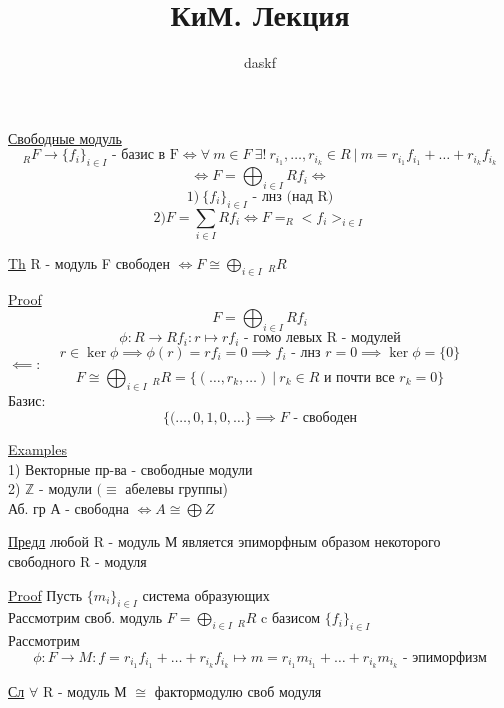 \documentclass[a4paper]{article}
\begin{document}
\title{КиМ. Лекция}
\author{daskf}
\maketitle

\underline{Свободные модуль}
\[
    _RF \rightarrow \{ f_i \}_{i \in I} \text{ - базис в F} \iff 
    \forall \ m \in F \ \exists ! \ r_{i_1}, \dots , r_{i_k} \in R \ | \ 
    m = r_{i_1}f_{i_1}+ \dots + r_{i_k}f_{i_k} 
\]
\[
    \iff F = \bigoplus_{i \in I} Rf_i \iff
\]
\[
    1) \ \{ f_i\}_{i \in I} \text{ - лнз (над R)}
\]
\[
    2) F = \sum_{i \in I}Rf_i \iff F = _R < f_i > _{i \in I}
\]

\begin{tcolorbox}
\underline{Th} R - модуль F свободен $ \iff F \cong \bigoplus_{i \in I}\  _R R $ 

\underline{Proof}
\[
    F = \bigoplus_{i \in I} Rf_i
\]
\[
    \phi: R \to R f_i: r \mapsto r f_i \text{ - гомо левых R - модулей} 
\]
\[
    r \in \ker \phi \implies \phi(r) = rf_i = 0 \implies f_i \text{ - лнз } r = 0
    \implies \ker \phi = \{0\}
\]
$ \impliedby: $ 
\[
    F \cong \bigoplus_{i \in I}\, _RR = \{ (\dots, r_k, \dots )\ | \ r_k \in R
    \text{ и почти все }r_k = 0 \}
\]
Базис:
\[
    \{ (\dots, 0, 1, 0, \dots \} \implies F \text{ - свободен}
\]
\end{tcolorbox}

\begin{tcolorbox}
\underline{Examples}\\
1) Векторные пр-ва - свободные модули\\
2) $ \mathbb{Z} $ - модули $ (\equiv $ абелевы группы)\\
Аб. гр А - свободна $ \iff A \cong \bigoplus Z $ 
\end{tcolorbox}

\begin{tcolorbox}
\underline{Предл} любой R - модуль М является эпиморфным образом некоторого свободного
R - модуля

\underline{Proof} Пусть $ \{ m_i \}_{i \in I} $ система образующих\\
Рассмотрим своб. модуль $ F = \bigoplus_{i \in I}\, _RR $ c базисом $ 
\{f_i\}_{ i \in I} $  \\

Рассмотрим
\[
    \phi: F \to M: f = r_{i_1}f_{i_1}+ \dots + r_{i_k}f_{i_k} \mapsto m = r_{i_1}m_{i_1}+
    \dots + r_{i_k}m_{i_k} \text{ - эпиморфизм}
\]

\underline{Сл} $ \forall $ R - модуль М $ \cong $ фактормодулю своб модуля

\end{tcolorbox}
\end{document}
